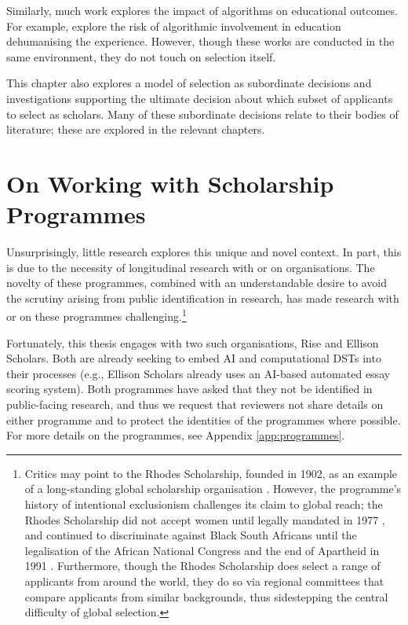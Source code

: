 Similarly, much work explores the impact of algorithms on educational outcomes. For example, \textcite{NISSENBAUM1998237} explore the risk of algorithmic involvement in education dehumanising the experience. However, though these works are conducted in the same environment, they do not touch on selection itself.

This chapter also explores a model of selection as subordinate decisions and investigations supporting the ultimate decision about which subset of applicants to select as scholars. Many of these subordinate decisions relate to their bodies of literature; these are explored in the relevant chapters.

\section{On Working with Scholarship Programmes}
Unsurprisingly, little research explores this unique and novel context. In part, this is due to the necessity of longitudinal research with or on organisations. The novelty of these programmes, combined with an understandable desire to avoid the scrutiny arising from public identification in research, has made research with or on these programmes challenging.\footnote{Critics may point to the Rhodes Scholarship, founded in 1902, as an example of a long-standing global scholarship organisation \cite{Ziegler_2008}. However, the programme's history of intentional exclusionism challenges its claim to global reach; the Rhodes Scholarship did not accept women until legally mandated in 1977 \cite{Ziegler_2008}, and continued to discriminate against Black South Africans until the legalisation of the African National Congress and the end of Apartheid in 1991 \cite{Ziegler_2008}. Furthermore, though the Rhodes Scholarship does select a range of applicants from around the world, they do so via regional committees that compare applicants from similar backgrounds, thus sidestepping the central difficulty of global selection.}

Fortunately, this thesis engages with two such organisations, Rise and Ellison Scholars. Both are already seeking to embed AI and computational DSTs into their processes (e.g., Ellison Scholars already uses an AI-based automated essay scoring system). Both programmes have asked that they not be identified in public-facing research, and thus we request that reviewers not share details on either programme and to protect the identities of the programmes where possible. For more details on the programmes, see Appendix \ref{app:programmes}.

